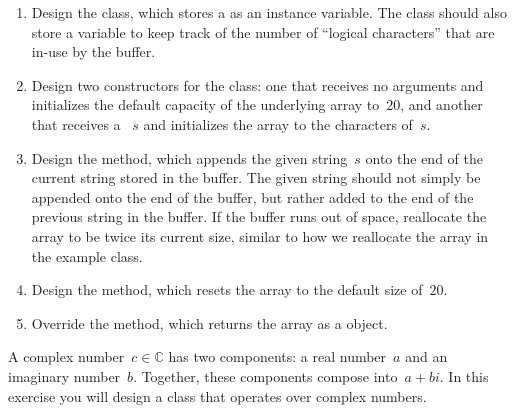 \begin{enumerate}[label=(\alph*)]
    \item Design the  class, which stores a  as an instance variable. The class should also store a variable to keep track of the number of ``logical characters'' that are in-use by the buffer.
    \item Design two constructors for the  class: one that receives no arguments and initializes the default capacity of the underlying  array to~$20$, and another that receives a ~$s$ and initializes the  array to the characters of~$s$. 
    \item Design the  method, which appends the given string~$s$ onto the end of the current string stored in the buffer. The given string should not simply be appended onto the end of the buffer, but rather added to the end of the previous string in the buffer. If the buffer runs out of space, reallocate the array to be twice its current size, similar to how we reallocate the array in the  example class.
    \item Design the  method, which resets the  array to the default size of~$20$.
    \item Override the  method, which returns the  array as a  object.
\end{enumerate}

A complex number~$c \in \mathbb{C}$ has two components: a real number~$a$ and an imaginary number~$b$. 
Together, these components compose into~$a + bi$. 
In this exercise you will design a class that operates over complex numbers.

